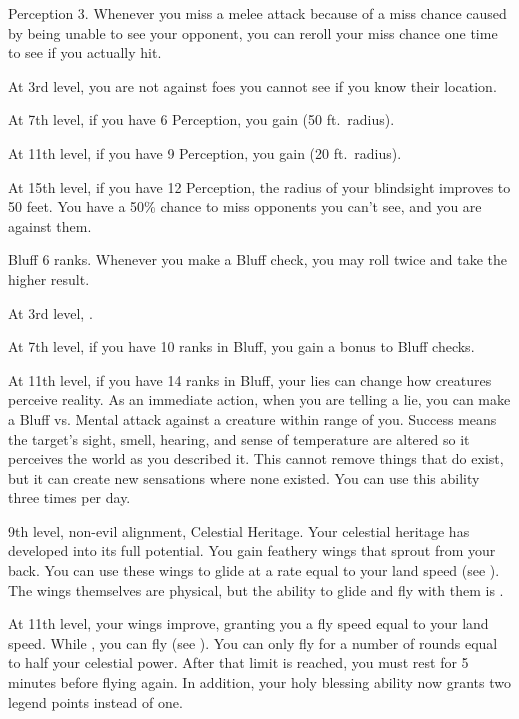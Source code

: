     \featpre Perception 3.
    \featben Whenever you miss a melee attack because of a miss chance caused by being unable to see your opponent, you can reroll your miss chance one time to see if you actually hit.

    At 3rd level, you are not  against foes you cannot see if you know their location.

    At 7th level, if you have 6 Perception, you gain  (50 ft.\ radius).

    At 11th level, if you have 9 Perception, you gain  (20 ft.\ radius).

    At 15th level, if you have 12 Perception, the radius of your blindsight improves to 50 feet.
     You have a 50\% chance to miss opponents you can't see, and you are  against them.

    \featpre Bluff 6 ranks.
    \featben Whenever you make a Bluff check, you may roll twice and take the higher result.

    At 3rd level, \tdash.

    At 7th level, if you have 10 ranks in Bluff, you gain a  bonus to Bluff checks.

    At 11th level, if you have 14 ranks in Bluff, your lies can change how creatures perceive reality.
    As an immediate action, when you are telling a lie, you can make a Bluff vs. Mental attack against a creature within \rngmed range of you.
    Success means the target's sight, smell, hearing, and sense of temperature are altered so it perceives the world as you described it.
    This cannot remove things that do exist, but it can create new sensations where none existed.
    You can use this ability three times per day.
    \magical

    \featpres 9th level, non-evil alignment, Celestial Heritage.
    \featben Your celestial heritage has developed into its full potential.
    You gain feathery wings that sprout from your back.
    You can use these wings to glide at a rate equal to your land speed (see ).
    The wings themselves are physical, but the ability to glide and fly with them is .

    At 11th level, your wings improve, granting you a fly speed equal to your land speed.
    While \unencumbered, you can fly (see ).
    You can only fly for a number of rounds equal to half your celestial power.
    After that limit is reached, you must rest for 5 minutes before flying again.
    In addition, your holy blessing ability now grants two legend points instead of one.

